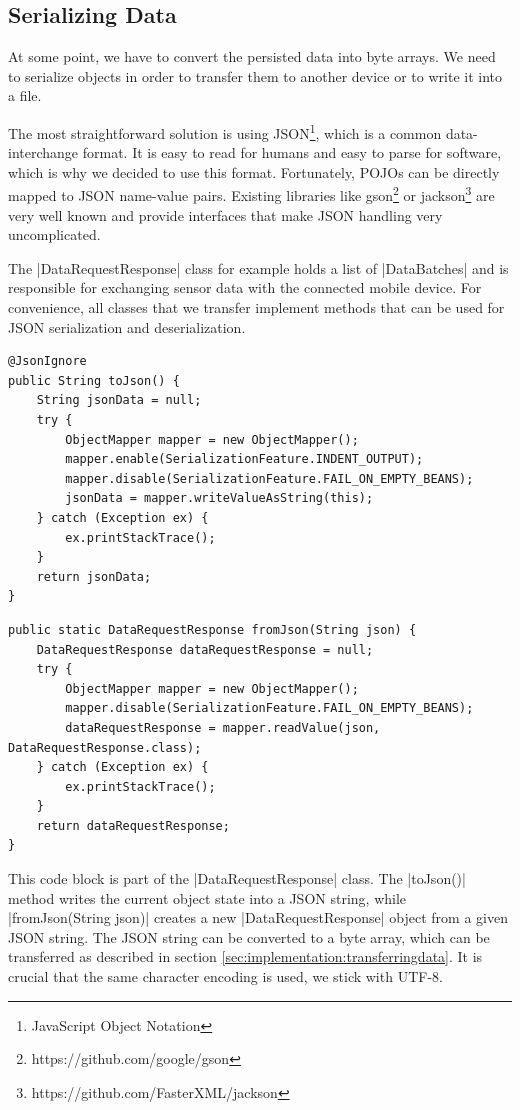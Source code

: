 \subsection{Serializing Data}
\label{sec:implementation:serializingdata}

At some point, we have to convert the persisted data into byte arrays.
We need to serialize objects in order to transfer them to another device or to write it into a file.

The most straightforward solution is using JSON\footnote{JavaScript Object Notation}, which is a common data-interchange format.
It is easy to read for humans and easy to parse for software, which is why we decided to use this format.
Fortunately, POJOs can be directly mapped to JSON name-value pairs.
Existing libraries like gson\footnote{https://github.com/google/gson} or jackson\footnote{https://github.com/FasterXML/jackson} are very well known and provide interfaces that make JSON handling very uncomplicated.

The |DataRequestResponse|\cite{sensordatalogger:datarequestresponse} class for example holds a list of |DataBatches| and is responsible for exchanging sensor data with the connected mobile device.
For convenience, all classes that we transfer implement methods that can be used for JSON serialization and deserialization.

\begin{lstlisting}[label=serialization]
@JsonIgnore
public String toJson() {
	String jsonData = null;
	try {
		ObjectMapper mapper = new ObjectMapper();
		mapper.enable(SerializationFeature.INDENT_OUTPUT);
		mapper.disable(SerializationFeature.FAIL_ON_EMPTY_BEANS);
		jsonData = mapper.writeValueAsString(this);
	} catch (Exception ex) {
		ex.printStackTrace();
	}
	return jsonData;
}
\end{lstlisting}

\clearpage

\begin{lstlisting}[label=deserialization]
public static DataRequestResponse fromJson(String json) {
	DataRequestResponse dataRequestResponse = null;
	try {
		ObjectMapper mapper = new ObjectMapper();
		mapper.disable(SerializationFeature.FAIL_ON_EMPTY_BEANS);
		dataRequestResponse = mapper.readValue(json, DataRequestResponse.class);
	} catch (Exception ex) {
		ex.printStackTrace();
	}
	return dataRequestResponse;
}
\end{lstlisting}

This code block is part of the |DataRequestResponse| class.
The |toJson()| method writes the current object state into a JSON string, while |fromJson(String json)| creates a new |DataRequestResponse| object from a given JSON string.
The JSON string can be converted to a byte array, which can be transferred as described in section \ref{sec:implementation:transferringdata}.
It is crucial that the same character encoding is used, we stick with UTF-8.

